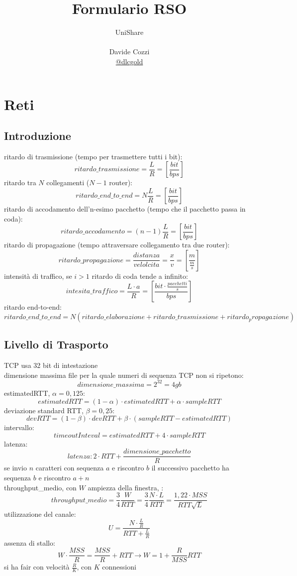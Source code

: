 \documentclass[a4paper,12pt, oneside]{book}
\title{Formulario RSO}
\author{UniShare\\\\Davide Cozzi\\\href{https://t.me/dlcgold}{@dlcgold}}
\date{}
\begin{document}
\maketitle


\newtheorem{teorema}{Teorema}
\newtheorem{definizione}{Definizione}
\newtheorem{esempio}{Esempio}
\newtheorem{corollario}{Corollario}
\newtheorem{lemma}{Lemma}
\newtheorem{osservazione}{Osservazione}
\newtheorem{nota}{Nota}
\newtheorem{esercizio}{Esercizio}
\tableofcontents

\renewcommand{\chaptermark}[1]{%
\markboth{\chaptername
\ \thechapter.\ #1}{}}
\renewcommand{\sectionmark}[1]{\markright{\thesection.\ #1}}
\chapter{Reti}
\section{Introduzione}
ritardo di trasmissione  (tempo per trasmettere tutti i bit):
$$ritardo\_trasmissione=\frac{L}{R}=\left[\frac{bit}{bps}\right]$$
ritardo tra $N$ collegamenti ($N-1$ router):
$$ritardo\_end\_to\_end=N\frac{L}{R}=\left[\frac{bit}{bps}\right]$$
ritardo di accodamento dell'n-esimo pacchetto (tempo che il pacchetto passa in coda):
$$ritardo\_accodamento=(n-1)\frac{L}{R}=\left[\frac{bit}{bps}\right]$$
ritardo di propagazione (tempo attraversare collegamento tra due router):
$$ritardo\_propagazione=\frac{distanza}{velolcita}=\frac{x}{v}=\left[\frac{m}{\frac{m}{s}}\right]$$
intensità di traffico, se $i>1$ ritardo di coda tende a infinito:
$$intesita\_traffico=\frac{L\cdot a}{R}=\left[\frac{bit\cdot \frac{pacchetti}{s}}{bps}\right]$$
ritardo end-to-end:
$$ritardo\_end\_to\_end=N(ritardo\_elaborazione+ritardo\_trasmissione+ritardo_propagazione)$$
\section{Livello di Trasporto}
TCP usa 32 bit di intestazione\\
dimensione massima file per la quale numeri di sequenza TCP non si ripetono:
$$dimensione\_massima=2^{32}=4gb$$
estimatedRTT, $\alpha=0,125$:
$$estimatedRTT=(1-\alpha)\cdot estimatedRTT+\alpha\cdot sampleRTT$$
deviazione standard RTT, $\beta=0,25$:
$$devRTT=(1-\beta)\cdot devRTT+\beta\cdot (sampleRTT-estimatedRTT)$$
intervallo:
$$timeoutInteval=estimatedRTT+4\cdot sampleRTT$$
latenza:
$$latenza:2\cdot RTT+\frac{dimensione\_pacchetto}{R}$$
se invio $n$ caratteri con sequenza $a$ e riscontro $b$ il successivo pacchetto ha sequenza $b$ e riscontro $a+n$\\
throughput\_medio, con $W$ ampiezza della finestra, :
$$throughput\_medio=\frac{3}{4}\frac{W}{RTT}=\frac{3}{4}\frac{N\cdot L}{RTT}=\frac{1,22\cdot MSS}{RTT\sqrt{L}}$$
utilizzazione del canale:
$$U=\frac{N\cdot \frac{L}{R}}{RTT+\frac{L}{R}}$$
assenza di stallo:
$$W\cdot \frac{MSS}{R}=\frac{MSS}{R}+RTT\to W=1+\frac{R}{MSS}RTT$$
si ha fair con velocità $\frac{R}{K}$, con $K$ connessioni
\newpage
\end{document}
